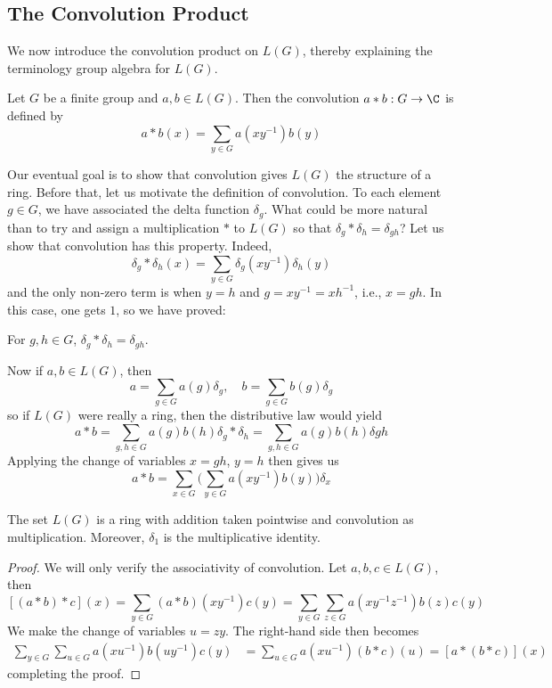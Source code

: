 \subsection{The Convolution Product}
We now introduce the convolution product on $L(G)$, thereby explaining the
terminology group algebra for $L(G)$.
\begin{definition}
Let $G$ be a finite group and $a,b\in L(G)$. Then the convolution $a\ast b:G\to\C$ is defined by
\[a\ast b(x)=\sum_{y\in G}a(xy^{-1})b(y)\]
\end{definition}
Our eventual goal is to show that convolution gives $L(G)$ the structure of a ring. Before that, let us motivate the definition of convolution. To each element $g\in G$, we have associated the delta function $\delta_g$. What could be more natural than to try and assign a multiplication $\ast$ to $L(G)$ so that $\delta_g\ast\delta_h=\delta_{gh}$? Let us show that convolution has this property. Indeed,
\[\delta_g\ast\delta_h(x)=\sum_{y\in G}\delta_g(xy^{-1})\delta_h(y)\]
and the only non-zero term is when $y=h$ and $g=xy^{-1}=xh^{-1}$, i.e., $x=gh$. In this case, one gets $1$, so we have proved:
\begin{proposition}
For $g,h\in G$, $\delta_g\ast\delta_h=\delta_{gh}$.
\end{proposition}
Now if $a,b\in L(G)$, then
\[a=\sum_{g\in G}a(g)\delta_g,\quad b=\sum_{g\in G}b(g)\delta_g\]
so if $L(G)$ were really a ring, then the distributive law would yield
\[a\ast b=\sum_{g,h\in G}a(g)b(h)\delta_g\ast\delta_h=\sum_{g,h\in G}a(g)b(h)\delta{gh}\]
Applying the change of variables $x=gh$, $y=h$ then gives us
\[a\ast b=\sum_{x\in G}\Big(\sum_{y\in G}a(xy^{-1})b(y)\Big)\delta_{x}\]
\begin{theorem}
The set $L(G)$ is a ring with addition taken pointwise and
convolution as multiplication. Moreover, $\delta_1$ is the multiplicative identity.
\end{theorem}
\begin{proof}
We will only verify the associativity of convolution. Let $a,b,c\in L(G)$, then 
\[[(a\ast b)\ast c](x)=\sum_{y\in G}(a\ast b)(xy^{-1})c(y)=\sum_{y\in G}\sum_{z\in G}a(xy^{-1}z^{-1})b(z)c(y)\]
We make the change of variables $u=zy$. The right-hand side then becomes
\begin{align*}
\sum_{y\in G}\sum_{u\in G}a(xu^{-1})b(uy^{-1})c(y)&=\sum_{u\in G}a(xu^{-1})(b\ast c)(u)=[a\ast(b\ast c)](x)
\end{align*}
completing the proof.
\end{proof}
